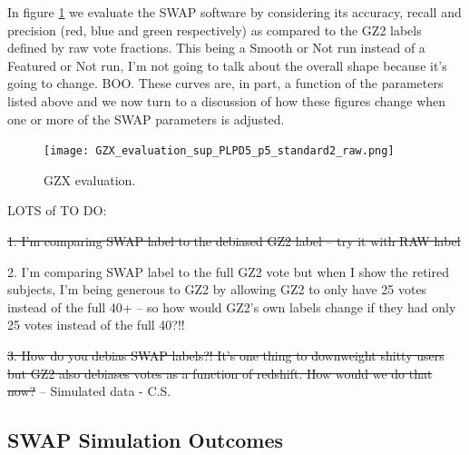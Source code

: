 \documentclass[twocolumn]{aastex6}
\begin{document}
In figure \ref{fig:swapeval} we evaluate the SWAP software by considering
its accuracy, recall and precision (red, blue and green respectively) as compared 
to the GZ2 labels defined by raw vote fractions.  This being a Smooth or Not run
instead of a Featured or Not run, I'm not going to talk about the overall shape
because it's going to change. BOO. These curves are, in part, a 
function of the parameters listed above and we now turn to a discussion of 
how these figures change when one or more of the SWAP parameters is adjusted. 


\begin{figure}[t!]
\texttt{[image: GZX\_evaluation\_sup\_PLPD5\_p5\_standard2\_raw.png]}
\caption{GZX evaluation. \label{fig:swapeval}}
\end{figure}

{\color{red} LOTS of TO DO:

\sout{1. I'm comparing SWAP label to the debiased GZ2 label -- try it with RAW label}

2. I'm comparing SWAP label to the full GZ2 vote but when I show the retired subjects,
I'm being generous to GZ2 by allowing GZ2 to only have 25 votes instead of the full 40+ -- 
so how would GZ2's own labels change if they had only 25 votes instead of the full 40?!!

\sout{3. How do you debias SWAP labels?! It's one thing to downweight shitty users but 
GZ2 also debiases votes as a function of redshift. How would we do that now?} -- Simulated data - C.S. }

\subsection{SWAP Simulation Outcomes}
\end{document}
